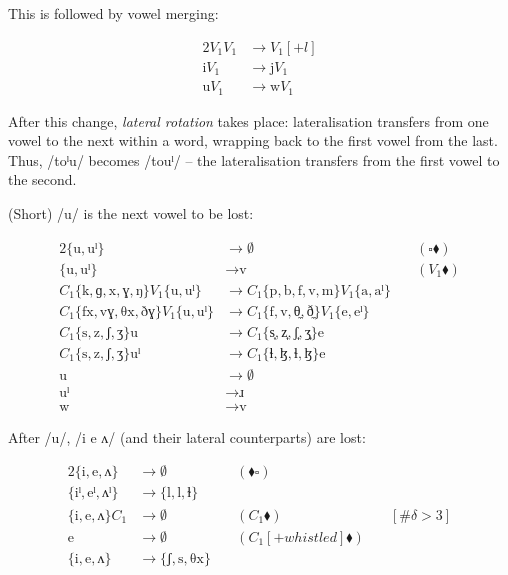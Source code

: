 \documentclass{book}
\begin{document}
This is followed by vowel merging:

\begin{alignat*}{2}
  V_1V_1 &\rightarrow V_1[+l] \\
  \text{i} V_1 &\rightarrow \text{j} V_1 \\
  \text{u} V_1 &\rightarrow \text{w} V_1
\end{alignat*}

After this change, \emph{lateral rotation} takes place: lateralisation transfers from one vowel to the next within a word, wrapping back to the first vowel from the last. Thus, /toˡu/ becomes /touˡ/ -- the lateralisation transfers from the first vowel to the second.

(Short) /u/ is the next vowel to be lost:

\begin{alignat*}{2}
  \{\text{u}, \text{uˡ}\} &\rightarrow \emptyset &\quad(\square \blacklozenge) \\
  \{\text{u}, \text{uˡ}\} &\rightarrow \text{v} &\quad(V_1 \blacklozenge) \\
  C_1\{\text{k}, \text{ɡ}, \text{x}, \text{ɣ}, \text{ŋ}\} V_1\{\text{u}, \text{uˡ}\} &\rightarrow
    C_1\{\text{p}, \text{b}, \text{f}, \text{v}, \text{m}\} V_1\{\text{a}, \text{aˡ}\} \\
  C_1\{\text{fx}, \text{vɣ}, \text{θx}, \text{ðɣ}\} V_1\{\text{u}, \text{uˡ}\} &\rightarrow
    C_1\{\text{f}, \text{v}, \text{θ̼}, \text{ð̼}\} V_1\{\text{e}, \text{eˡ}\} \\
  C_1\{\text{s}, \text{z}, \text{ʃ}, \text{ʒ}\} \text{u} &\rightarrow
    C_1\{\text{s͎}, \text{z͎}, \text{ʃ͎}, \text{ʒ͎}\} \text{e} \\
  C_1\{\text{s}, \text{z}, \text{ʃ}, \text{ʒ}\} \text{uˡ} &\rightarrow
    C_1\{\text{ɬ}, \text{ɮ}, \text{ɬ}, \text{ɮ}\} \text{e} \\
  \text{u} &\rightarrow \emptyset \\
  \text{uˡ} &\rightarrow \text{ɹ} \\
  \text{w} &\rightarrow \text{v}
\end{alignat*}

After /u/, /i e ʌ/ (and their lateral counterparts) are lost:

\begin{alignat*}{2}
  \{\text{i}, \text{e}, \text{ʌ}\} &\rightarrow
    \emptyset &\quad(\blacklozenge \square) \\
  \{\text{iˡ}, \text{eˡ}, \text{ʌˡ}\} &\rightarrow
    \{\text{l}, \text{l}, \text{ɫ}\} \\
  \{\text{i}, \text{e}, \text{ʌ}\} C_1 &\rightarrow
    \emptyset &\quad(C_1 \blacklozenge) &\quad[\#\delta > 3] \\
  \text{e} &\rightarrow \emptyset &\quad(C_1[+whistled] \blacklozenge) \\
  \{\text{i}, \text{e}, \text{ʌ}\} &\rightarrow
    \{\text{ʃ}, \text{s}, \text{θx}\}
\end{alignat*}
\end{document}
